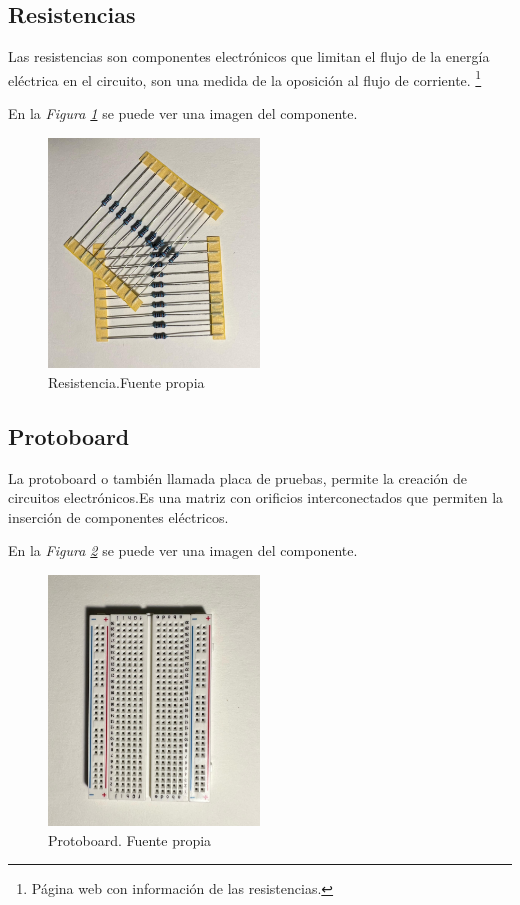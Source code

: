 \subsection{Resistencias}
Las resistencias son componentes electrónicos que limitan el flujo de la energía eléctrica en el circuito, son una medida de la oposición al flujo de corriente.  \cite{Resistencia}\footnote{Página web con información de las resistencias\cite{Resistencia}.}

En la \textit{Figura \ref{fig:Resistencias}} se puede ver una imagen del componente.
\begin{figure}[h]
        \centering
        \includegraphics[width=0.5\textwidth]{img/Resistencias.png}
        \caption{Resistencia.Fuente propia}
        \label{fig:Resistencias}
    \end{figure}
    
\subsection{Protoboard}
La protoboard o también llamada placa de pruebas, permite la creación de circuitos electrónicos.Es una matriz con orificios interconectados que permiten la inserción de componentes eléctricos. 

En la \textit{Figura \ref{fig:Protoboard} } se puede ver una imagen del componente.
\begin{figure}[h]
        \centering
        \includegraphics[angle=90,width=0.5\textwidth]{img/Protoboard.png}
        \caption{Protoboard. Fuente propia}
        \label{fig:Protoboard}
    \end{figure}

